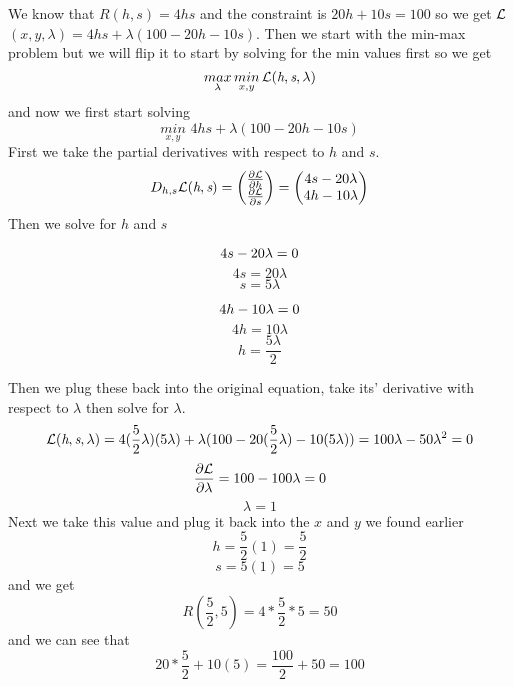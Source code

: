 \documentclass[12pt]{article}
\begin{document}
We know that $R(h, s) = 4hs$ and the constraint is $20h + 10s = 100$ so we get $\cal{L}$ $(x, y, \lambda) = 4hs + \lambda (100 - 20h - 10s)$.
Then we start with the min-max problem but we will flip it to start by solving for the min values first so we get
\[
\underset{\lambda}{max}\, \underset{x, y}{min} \, \cal{L} (\textit{h}, \textit{s}, \lambda)
\]
and now we first start solving
\[
\underset{x, y}{min} \,\, 4hs + \lambda (100 - 20h - 10s)
\]
First we take the partial derivatives with respect to $h$ and $s$.
\[
D_{h, s} \cal{L} (\textit{h}, \textit{s}) = 
\begin{pmatrix}
\frac{\partial\cal{L}}{\partial h} \\
\frac{\partial\cal{L}}{\partial s}
\end{pmatrix} =
\begin{pmatrix}
4s - 20\lambda \\
4h - 10\lambda
\end{pmatrix} 
\]
Then we solve for $h$ and $s$
\begin{minipage}[t]{0.2\textwidth}
\[
4s - 20\lambda = 0 \\
\]
\[
4s = 20\lambda 
\]
\[
s = 5\lambda
\]    
\end{minipage}
\hfill
\begin{minipage}[t]{0.2\textwidth}
\[
4h - 10\lambda = 0 \\
\]
\[
4h = 10\lambda
\]
\[
h = \frac{5\lambda}{2}
\]
\end{minipage}

Then we plug these back into the original equation, take its' derivative with respect to $\lambda$ then solve for $\lambda$.
\[
{\cal{L}} (\textit{h}, \textit{s}, \lambda) = 
4(\frac{5}{2}\lambda )(5\lambda ) + \lambda (100 - 20(\frac{5}{2}\lambda ) - 10(5\lambda )) = 100\lambda - 50\lambda^{2} = 0
\]
\[
\frac{\partial\cal{L}}{\partial\lambda} = 100 - 100\lambda = 0
\]
\[
\lambda = 1
\]
Next we take this value and plug it back into the $x$ and $y$ we found earlier
\[
h = \frac{5}{2}(1) = \frac{5}{2}
\]
\[
s = 5(1) = 5
\]
and we get
\[
\boxed{R(\frac{5}{2}, 5) = 4 * \frac{5}{2} * 5 = 50}
\]
and we can see that
\[
20 * \frac{5}{2} + 10(5) = \frac{100}{2} + 50 = 100
\]
\end{document}
